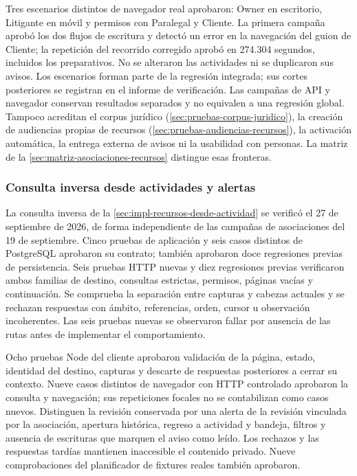 Tres escenarios distintos de navegador real aprobaron: Owner en escritorio, Litigante en móvil y permisos con Paralegal y Cliente. La primera campaña aprobó los dos flujos de escritura y detectó un error en la navegación del guion de Cliente; la repetición del recorrido corregido aprobó en 274.304 segundos, incluidos los preparativos. No se alteraron las actividades ni se duplicaron sus avisos. Los escenarios forman parte de la regresión integrada; sus cortes posteriores se registran en el informe de verificación. Las campañas de API y navegador conservan resultados separados y no equivalen a una regresión global. Tampoco acreditan el corpus jurídico (\cref{sec:pruebas-corpus-juridico}), la creación de audiencias propias de recursos (\cref{sec:pruebas-audiencias-recursos}), la activación automática, la entrega externa de avisos ni la usabilidad con personas. La matriz de la \cref{sec:matriz-asociaciones-recursos} distingue esas fronteras.

\subsubsection{Consulta inversa desde actividades y alertas}\label{sec:pruebas-recursos-desde-actividad}

La consulta inversa de la \cref{sec:impl-recursos-desde-actividad} se verificó el 27 de septiembre de 2026, de forma independiente de las campañas de asociaciones del 19 de septiembre. Cinco pruebas de aplicación y seis casos distintos de PostgreSQL aprobaron su contrato; también aprobaron doce regresiones previas de persistencia. Seis pruebas HTTP nuevas y diez regresiones previas verificaron ambas familias de destino, consultas estrictas, permisos, páginas vacías y continuación. Se comprueba la separación entre capturas y cabezas actuales y se rechazan respuestas con ámbito, referencias, orden, cursor u observación incoherentes. Las seis pruebas nuevas se observaron fallar por ausencia de las rutas antes de implementar el comportamiento.

Ocho pruebas Node del cliente aprobaron validación de la página, estado, identidad del destino, capturas y descarte de respuestas posteriores a cerrar su contexto. Nueve casos distintos de navegador con HTTP controlado aprobaron la consulta y navegación; sus repeticiones focales no se contabilizan como casos nuevos. Distinguen la revisión conservada por una alerta de la revisión vinculada por la asociación, apertura histórica, regreso a actividad y bandeja, filtros y ausencia de escrituras que marquen el aviso como leído. Los rechazos y las respuestas tardías mantienen inaccesible el contenido privado. Nueve comprobaciones del planificador de fixtures reales también aprobaron.

